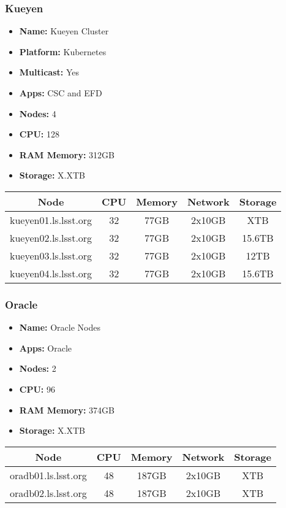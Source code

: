 \newpage
\subsubsection{Kueyen}
\begin{itemize}
  \itemsep0em 
  \item \textbf{Name:}       Kueyen Cluster
  \item \textbf{Platform:}   Kubernetes
  \item \textbf{Multicast:}  Yes
  \item \textbf{Apps:}       CSC and EFD
  \item \textbf{Nodes:}      4
  \item \textbf{CPU:}        128
  \item \textbf{RAM Memory:} 312GB
  \item \textbf{Storage:}   X.XTB
\end{itemize}
\begin{center}
  \small
  \begin{tabular}{||c c c c c||}
    \hline
    \textbf{Node} & \textbf{CPU} & \textbf{Memory} & \textbf{Network} & \textbf{Storage} \\ [0.5ex]
    \hline
    kueyen01.ls.lsst.org & 32 & 77GB & 2x10GB & XTB \\
    \hline
    kueyen02.ls.lsst.org & 32 & 77GB & 2x10GB & 15.6TB \\
    \hline
    kueyen03.ls.lsst.org & 32 & 77GB & 2x10GB & 12TB \\
    \hline
    kueyen04.ls.lsst.org & 32 & 77GB & 2x10GB & 15.6TB \\
    \hline
  \end{tabular}
\end{center}

\subsubsection{Oracle}
\begin{itemize}
  \itemsep0em 
  \item \textbf{Name:}       Oracle Nodes
  \item \textbf{Apps:}       Oracle
  \item \textbf{Nodes:}      2
  \item \textbf{CPU:}        96
  \item \textbf{RAM Memory:} 374GB
  \item \textbf{Storage:}   X.XTB
\end{itemize}
\begin{center}
  \small
  \begin{tabular}{||c c c c c||} 
    \hline
    \textbf{Node} & \textbf{CPU} & \textbf{Memory} & \textbf{Network} & \textbf{Storage} \\ [0.5ex] 
    \hline
    oradb01.ls.lsst.org & 48 & 187GB & 2x10GB & XTB \\
    \hline
    oradb02.ls.lsst.org & 48 & 187GB & 2x10GB & XTB \\
    \hline
  \end{tabular}
\end{center}

